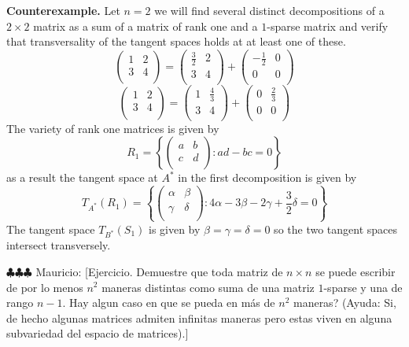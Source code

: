 \documentclass[12pt]{amsart}
\numberwithin{equation}{section}
\newcommand{\mv}[1]{{\color{red} \sf $\clubsuit\clubsuit\clubsuit$ Mauricio: [#1]}}
\begin{document}
{\bf Counterexample.} Let $n=2$ we will find several distinct decompositions of a $2\times 2$ matrix as a sum of a matrix of rank one and a $1$-sparse matrix and verify that transversality of the tangent spaces holds at at least one of these.
\[
\left(
\begin{array}{cc}
1 & 2\\
3 & 4\\
\end{array}
\right)=
\left(
\begin{array}{cc}
\frac{3}{2} & 2\\
3 & 4\\
\end{array}
\right)
+\left(
\begin{array}{cc}
-\frac{1}{2} & 0\\
0 & 0\\
\end{array}
\right)
\]
\[
\left(
\begin{array}{cc}
1 & 2\\
3 & 4\\
\end{array}
\right)=
\left(
\begin{array}{cc}
1 & \frac{4}{3}\\
3 & 4\\
\end{array}
\right)
+\left(
\begin{array}{cc}
0 & \frac{2}{3}\\
0 & 0\\
\end{array}
\right)
\]
The variety of rank one matrices is given by 
\[R_1=\left\{
\left(\begin{array}{cc}
a & b\\
c & d\\
\end{array}
\right):ad-bc=0
\right\}
\]
as a result the tangent space at $A^*$ in the first decomposition is given by
\[T_{A^*}(R_1)=\left\{
\left(\begin{array}{cc}
\alpha & \beta\\
\gamma & \delta\\
\end{array}
\right):4\alpha-3\beta-2\gamma+\frac{3}{2}\delta=0
\right\}\]   
The tangent space $T_{B^*}(S_1)$ is given by $\beta=\gamma=\delta=0$ so the two tangent spaces intersect transversely.

\mv{Ejercicio. Demuestre que toda matriz de $n\times n$ se puede escribir de por lo menos $n^2$ maneras distintas como suma de una matriz $1$-sparse y una de rango $n-1$. Hay algun caso en que se pueda en m\'as de $n^2$ maneras? (Ayuda: Si, de hecho algunas matrices admiten infinitas maneras pero estas viven en alguna subvariedad del espacio de matrices).} 
\end{document}
